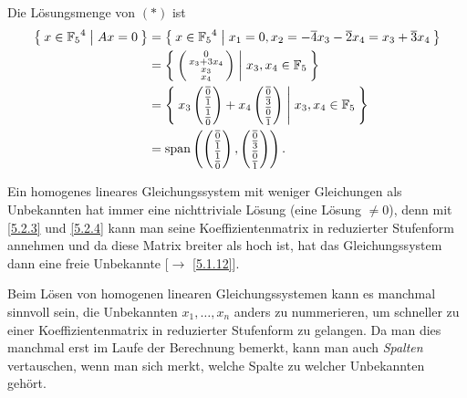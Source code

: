 \documentclass[../../main.tex]{subfiles}
\begin{document}
\begin{bsp}
Die Lösungsmenge von $(*)$ ist
\begin{align*}
\Set{x\in {\mathbb F_5}^4 | Ax = 0}&=\Set{x\in {\mathbb F_5}^4 | x_1 = 0, x_2 = -\overline{4}x_3-\overline{2}x_4 = x_3+\overline{3}x_4} \\
&=\Set{\left(\begin{smallmatrix}0\\x_3+3x_4\\x_3\\x_4\end{smallmatrix}\right) | x_3,x_4\in \mathbb F_5}\\
&=\Set{x_3\left(\begin{smallmatrix}\overline{0}\\\overline{1}\\\overline{1}\\\overline{0}\end{smallmatrix}\right) +x_4\left(\begin{smallmatrix}\overline{0}\\\overline{3}\\\overline{0}\\\overline{1}\end{smallmatrix}\right) | x_3, x_4\in \mathbb F_5}\\
&=\operatorname{span}\left(\left(\begin{smallmatrix}\overline{0}\\\overline{1}\\\overline{1}\\\overline{0}\end{smallmatrix}\right),\left(\begin{smallmatrix}\overline{0}\\\overline{3}\\\overline{0}\\\overline{1}\end{smallmatrix}\right)\right).
\end{align*}
\end{bsp}

\begin{bem}\label{5.2.7}
Ein homogenes lineares Gleichungssystem mit weniger Gleichungen als Unbekannten hat immer eine nichttriviale Lösung (eine Lösung $\neq 0$), denn mit \ref{5.2.3} und \ref{5.2.4} kann man seine Koeffizientenmatrix in reduzierter Stufenform annehmen und da diese Matrix breiter als hoch ist, hat das Gleichungssystem dann eine freie Unbekannte [$\to$ \ref{5.1.12}].
\end{bem}

\begin{bem}\label{5.2.8}
Beim Lösen von homogenen linearen Gleichungssystemen kann es manchmal sinnvoll sein, die Unbekannten $x_1,\ldots,x_n$ anders zu nummerieren, um schneller zu einer Koeffizientenmatrix in reduzierter Stufenform zu gelangen. Da man dies manchmal erst im Laufe der Berechnung bemerkt, kann man auch \emph{Spalten} vertauschen, wenn man sich merkt, welche Spalte zu welcher Unbekannten gehört.
\end{bem}
\end{document}
